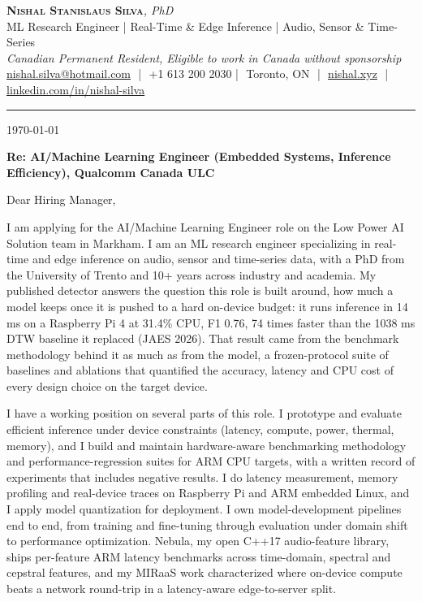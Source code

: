 \documentclass[11pt]{article}
\makeatletter
\newcommand{\clName}{Nishal Stanislaus Silva}
\newcommand{\clEmail}{nishal.silva@hotmail.com}
\newcommand{\clPhone}{+1 613 200 2030}
\newcommand{\clCity}{Toronto, ON}
\newcommand{\clSite}{https://nishal.xyz}
\newcommand{\clLinkedIn}{https://www.linkedin.com/in/nishal-silva}
\newcommand{\clStatus}{Canadian Permanent Resident, Eligible to work in Canada without sponsorship}
\newcommand{\clTagline}{ML Research Engineer | Real-Time \& Edge Inference | Audio, Sensor \& Time-Series}
\newcommand{\clRole}{AI/Machine Learning Engineer (Embedded Systems, Inference Efficiency)}
\newcommand{\clCompany}{Qualcomm Canada ULC}
\newcommand{\clAddressee}{Dear Hiring Manager,}
\makeatother
\begin{document}
\pagestyle{empty}
\begin{center}
    {\LARGE \scshape \textbf{\clName}}{\large \textit{, PhD}}\\[1pt]
    {\small \clTagline}\\[1pt]
    {\footnotesize\textit{\clStatus}}\\[1pt]
    {\small
    \href{mailto:\clEmail}{\clEmail} \,\,|\,\, \clPhone \,\,|\,\, \clCity
    \,\,|\,\, \href{\clSite}{nishal.xyz} \,\,|\,\, \href{\clLinkedIn}{linkedin.com/in/nishal-silva}}
\end{center}

\rule{\linewidth}{0.4pt}\vspace{0.6em}

\today

\textbf{Re: \clRole{}, \clCompany{}}

\clAddressee

I am applying for the AI/Machine Learning Engineer role on the Low Power AI Solution team in Markham. I am an ML research engineer specializing in real-time and edge inference on audio, sensor and time-series data, with a PhD from the University of Trento and 10+ years across industry and academia. My published detector answers the question this role is built around, how much a model keeps once it is pushed to a hard on-device budget: it runs inference in 14 ms on a Raspberry Pi 4 at 31.4\% CPU, F1 0.76, 74 times faster than the 1038 ms DTW baseline it replaced (JAES 2026). That result came from the benchmark methodology behind it as much as from the model, a frozen-protocol suite of baselines and ablations that quantified the accuracy, latency and CPU cost of every design choice on the target device.

I have a working position on several parts of this role. I prototype and evaluate efficient inference under device constraints (latency, compute, power, thermal, memory), and I build and maintain hardware-aware benchmarking methodology and performance-regression suites for ARM CPU targets, with a written record of experiments that includes negative results. I do latency measurement, memory profiling and real-device traces on Raspberry Pi and ARM embedded Linux, and I apply model quantization for deployment. I own model-development pipelines end to end, from training and fine-tuning through evaluation under domain shift to performance optimization. Nebula, my open C++17 audio-feature library, ships per-feature ARM latency benchmarks across time-domain, spectral and cepstral features, and my MIRaaS work characterized where on-device compute beats a network round-trip in a latency-aware edge-to-server split.
\end{document}
